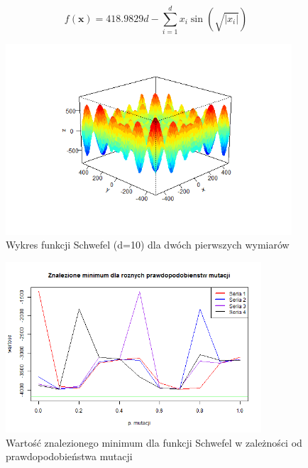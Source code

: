 \documentclass[11pt, a4paper]{article}
\begin{document}
\begin{equation}\label{eq:schwefel}
f(\boldsymbol{x}) = 418.9829d - \sum_{i=1}^{d} x_i \sin(\sqrt{|x_i|})
\end{equation}

\begin{figure}[H]
	\begin{center}
		\includegraphics[width=0.95\textwidth]{./assets/Schwefel1.png}
		\caption{Wykres funkcji Schwefel (d=10) dla dwóch pierwszych wymiarów}
		\label{fig:schwefel1}
	\end{center}
\end{figure}

\begin{figure}[H]
	\begin{center}
		\includegraphics[width=0.85\textwidth]{./assets/Schwefel2.png}
		\caption{Wartość znalezionego minimum dla funkcji Schwefel w zależności od prawdopodobieństwa mutacji}
		\label{fig:schwefel2}
	\end{center}
\end{figure}
\end{document}
